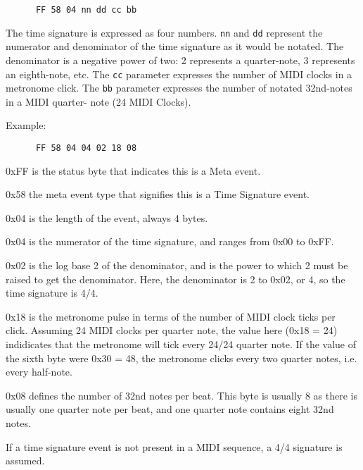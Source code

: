    \begin{verbatim}
      FF 58 04 nn dd cc bb
   \end{verbatim}

   The time signature is expressed as four numbers.
   \texttt{nn} and \texttt{dd} represent the numerator and denominator of the
   time signature as it would be notated.  The denominator is a negative power
   of two:  2 represents a quarter-note, 3 represents an eighth-note, etc.  The
   \texttt{cc} parameter expresses the number of MIDI clocks in a metronome
   click.  The \texttt{bb} parameter expresses the number of notated 32nd-notes
   in a MIDI quarter- note (24 MIDI Clocks).

   Example:

   \begin{verbatim}
      FF 58 04 04 02 18 08
   \end{verbatim}

   \begin{enumber}
      \item 0xFF is the status byte that indicates this is a Meta event.
      \item 0x58 the meta event type that signifies this is a Time Signature
         event.
      \item 0x04 is the length of the event, always 4 bytes.
      \item 0x04 is the numerator of the time signature, and ranges from 0x00
         to 0xFF.
      \item 0x02 is the log base 2 of the denominator, and is the power to
         which 2 must be raised to get the denominator.  Here, the denominator
         is 2 to 0x02, or 4, so the time signature is 4/4.
      \item 0x18 is the metronome pulse in terms of the number of
         MIDI clock ticks per click.  Assuming 24 MIDI clocks per quarter note,
         the value here (0x18 = 24) indidicates that the metronome will tick
         every 24/24 quarter note.  If the value of the sixth byte were 0x30 =
         48, the metronome clicks every two quarter notes, i.e. every
         half-note.
      \item 0x08 defines the number of 32nd notes per beat. This byte is
         usually 8 as there is usually one quarter note per beat, and one
         quarter note contains eight 32nd notes.
   \end{enumber}

   If a time signature event is not present in a MIDI sequence, a 4/4 signature
   is assumed.

